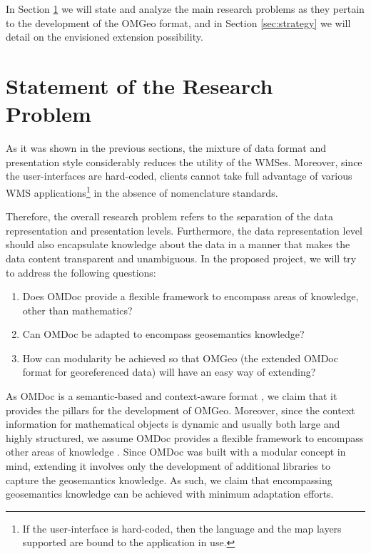 \documentclass[a4paper,11pt,openany,notitlepage]{article}
\begin{document}
In Section \ref{sec:statement} we will state and analyze the main research problems as they pertain to the development of the OMGeo format, and in Section \ref{sec:strategy} we will detail on the envisioned extension possibility.

%
\section{Statement of the Research Problem} \label{sec:statement}
\indent

As it was shown in the previous sections, the mixture of data format and presentation style considerably reduces the utility of the WMSes. Moreover, since the user-interfaces are hard-coded, clients cannot take full advantage of various WMS applications\footnote{If the user-interface is hard-coded, then the language and the map layers supported are bound to the application in use.} in the absence of nomenclature standards.

Therefore, the overall research problem refers to the separation of the data representation and presentation levels. Furthermore, the data representation level should also encapsulate knowledge about the data in a manner that makes the data content transparent and unambiguous. In the proposed project, we will try to address the following questions:
\begin{enumerate}
	\item Does OMDoc provide a flexible framework to encompass areas of knowledge, other than mathematics?		
	\item Can OMDoc be adapted to encompass geosemantics knowledge?			
	\item How can modularity be achieved so that OMGeo (the extended OMDoc format for georeferenced data) will have an easy way of extending?		
\end{enumerate}

As OMDoc is a semantic-based and context-aware format \cite{kohlhase2004}, we claim that it provides the pillars for the development of OMGeo. Moreover, since the context information for mathematical objects is dynamic and usually both large and highly structured, we assume OMDoc provides a flexible framework to encompass other areas of knowledge \cite{mkm2005}. Since OMDoc was built with a modular concept in mind, extending it involves only the development of additional libraries to capture the geosemantics knowledge. As such, we claim that encompassing geosemantics knowledge can be achieved with minimum adaptation efforts.
\end{document}
